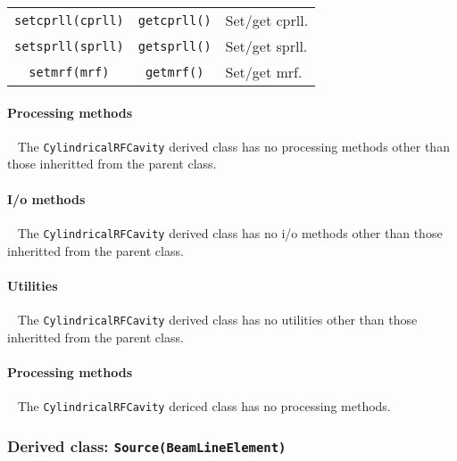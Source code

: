 \begin{table}[h]
\begin{center}
\begin{tabular}{|c|c|p{5cm}|}
      \texttt{setcprll(cprll)}              & \texttt{getcprll()}             & Set/get cprll.                     \\
      \texttt{setsprll(sprll)}              & \texttt{getsprll()}             & Set/get sprll.                     \\
      \texttt{setmrf(mrf)}                  & \texttt{getmrf()}              & Set/get mrf.                     \\
      \hline
    \end{tabular}
  \end{center}
\end{table}

\paragraph{Processing methods} ~\newline
\noindent
The \texttt{CylindricalRFCavity} derived class has no processing
methods other than those inheritted from the parent class.

\paragraph{I/o methods} ~\newline
\noindent
The \texttt{CylindricalRFCavity} derived class has no i/o methods other
than those inheritted from the parent class.

\paragraph{Utilities} ~\newline
\noindent
The \texttt{CylindricalRFCavity} derived class has no utilities other
than those inheritted from the parent class. 

\paragraph{Processing methods} ~\newline
\noindent
The \texttt{CylindricalRFCavity} dericed class has no processing methods.

\FloatBarrier

\subsubsection{Derived class: \texttt{Source(BeamLineElement)}}
\label{subsubSect:A1:BLE:Source}

